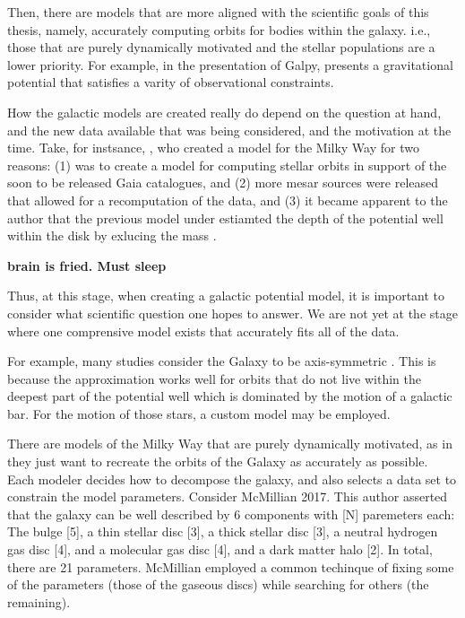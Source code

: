         Then, there are models that are more aligned with the scientific goals of this thesis, namely, accurately computing orbits for bodies within the galaxy. i.e., those that are purely dynamically motivated and the stellar populations are a lower priority. For example, in the presentation of Galpy, \citet{2015ApJS..216...29B} presents a gravitational potential that satisfies a varity of observational constraints. 

        How the galactic models are created really do depend on the question at hand, and the new data available that was being considered, and the motivation at the time. Take, for instsance, \citet{2017MNRAS.465...76M}, who created a model for the Milky Way for two reasons: (1) was to create a model for computing stellar orbits in support of the soon to be released Gaia catalogues, and (2) more mesar sources were released that allowed for a recomputation of the data, and (3) it became apparent to the author that the previous model under estiamted the depth of the potential well within the disk by exlucing the mass \citep{2011MNRAS.414.2446M}.

        \textbf{brain is fried. Must sleep}




     
        

        Thus, at this stage, when creating a galactic potential model, it is important to consider what scientific question one hopes to answer. We are not yet at the stage where one comprensive model exists that accurately fits all of the data. 
        
        For example, many studies consider the Galaxy to be axis-symmetric \citep{Ibata,McMillian,Body,Pouliasis,Besançon}. This is because the approximation works well for orbits that do not live within the deepest part of the potential well which is dominated by the motion of a galactic bar. For the motion of those stars, a custom model may be employed. 

        There are models of the Milky Way that are purely dynamically motivated, as in they just want to recreate the orbits of the Galaxy as accurately as possible. Each modeler decides how to decompose the galaxy, and also selects a data set to constrain the model parameters. Consider McMillian 2017. This author asserted that the galaxy can be well described by 6 components with [N] paremeters each: The bulge [5], a thin stellar disc [3], a thick stellar disc [3], a neutral hydrogen gas disc [4], and a molecular gas disc [4], and a dark matter halo [2]. In total, there are 21 parameters. McMillian employed a common techinque of fixing some of the parameters (those of the gaseous discs) while searching for others (the remaining). 
        



